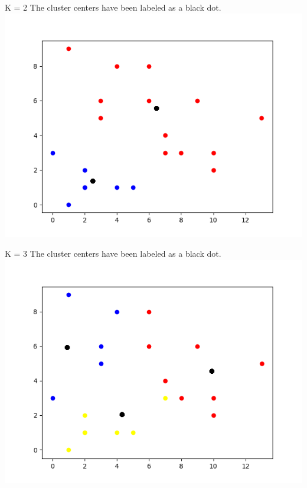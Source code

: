 \documentclass{article}
\begin{document}
	\begin{center}
		K = 2 The cluster centers have been labeled as a black dot.
		\includegraphics[scale=.8]{KMeans_K=2C.png}
	\end{center}
	\begin{center}
			K = 3 The cluster centers have been labeled as a black dot.
			\includegraphics[scale=.8]{KMeans_K=3C.png}
	\end{center}
	
\end{document}
